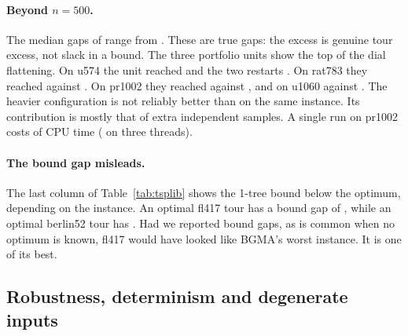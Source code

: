 \paragraph{Beyond $n=500$.}
The median gaps of  range from . These are true gaps: the excess is genuine tour excess,
not slack in a bound. The three portfolio units show the top of the dial flattening. On u574 the
 unit reached  and the two  restarts . On rat783
they reached  against . On pr1002 they reached
 against , and on u1060  against
. The heavier  configuration is not reliably better than  on the
same instance. Its contribution is mostly that of extra independent samples. A single  run on
pr1002 costs  of CPU time ( on three threads).



\paragraph{The bound gap misleads.}
The last column of Table~\ref{tab:tsplib} shows the 1-tree bound  below the optimum,
depending on the instance. An optimal fl417 tour has a bound gap of , while an
optimal berlin52 tour has . Had we reported bound gaps, as is common when no
optimum is known, fl417 would have looked like BGMA's worst instance. It is one of its best.

\subsection{Robustness, determinism and degenerate inputs}\label{sec:robust}

